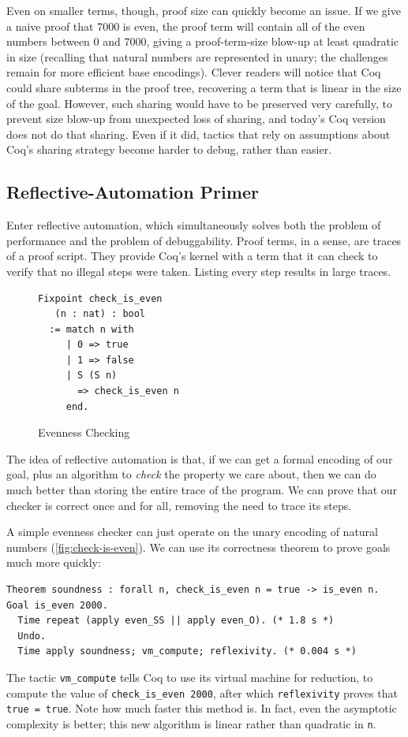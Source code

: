 Even on smaller terms, though, proof size can quickly become an issue.
If we give a naive proof that 7000 is even, the proof term will contain all of the even numbers between 0 and 7000, giving a proof-term-size blow-up at least quadratic in size (recalling that natural numbers are represented in unary; the challenges remain for more efficient base encodings).
Clever readers will notice that Coq could share subterms in the proof tree, recovering a term that is linear in the size of the goal.
However, such sharing would have to be preserved very carefully, to prevent size blow-up from unexpected loss of sharing, and today's Coq version does not do that sharing.
Even if it did, tactics that rely on assumptions about Coq's sharing strategy become harder to debug, rather than easier.

\subsection{Reflective-Automation Primer}\label{sec:evenness}
Enter reflective automation, which simultaneously solves both the problem of performance and the problem of debuggability.
Proof terms, in a sense, are traces of a proof script.
They provide Coq's kernel with a term that it can check to verify that no illegal steps were taken.
Listing every step results in large traces.

\begin{figure}
\vspace{-33pt}
\begin{verbatim}
Fixpoint check_is_even
   (n : nat) : bool
  := match n with
     | 0 => true
     | 1 => false
     | S (S n)
       => check_is_even n
     end.
\end{verbatim}
\vspace{-18pt}
\caption{Evenness Checking}\label{fig:check-is-even}
\end{figure}
The idea of reflective automation is that, if we can get a formal encoding of our goal, plus an algorithm to \emph{check} the property we care about, then we can do much better than storing the entire trace of the program.
We can prove that our checker is correct once and for all, removing the need to trace its steps.

A simple evenness checker can just operate on the unary encoding of natural numbers (\autoref{fig:check-is-even}).
We can use its correctness theorem to prove goals much more quickly:
\begin{verbatim}
Theorem soundness : forall n, check_is_even n = true -> is_even n.
Goal is_even 2000.
  Time repeat (apply even_SS || apply even_O). (* 1.8 s *)
  Undo.
  Time apply soundness; vm_compute; reflexivity. (* 0.004 s *)
\end{verbatim}
The tactic \texttt{vm\_compute} tells Coq to use its virtual machine for reduction, to compute the value of \texttt{check\_is\_even 2000}, after which \texttt{reflexivity} proves that \texttt{true = true}.
Note how much faster this method is.
In fact, even the asymptotic complexity is better; this new algorithm is linear rather than quadratic in \texttt{n}.

